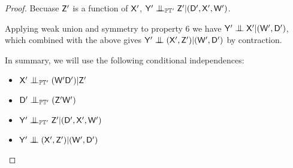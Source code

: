 \begin{proof}
Becuase $\mathsf{Z}'$ is a function of $\mathsf{X}'$, $\RV{Y}'\CI_{\prob{P}\kernel{T}'}\RV{Z}'|(\RV{D}',\RV{X}',\RV{W}')$. 

Applying weak union and symmetry to property 6 we have $\RV{Y}'\CI \RV{X}'|(\RV{W}',\RV{D}')$, which combined with the above gives $\RV{Y}'\CI (\RV{X}', \RV{Z}') |(\RV{W}',\RV{D}')$ by contraction.

In summary, we will use the following conditional independences:
\begin{itemize}
    \item $\RV{X}'\CI_{\prob{P}\kernel{T}'} (\RV{W}' \RV{D}')|\RV{Z}'$
    \item $\RV{D}'\CI_{\prob{P}\kernel{T}'}(\RV{Z}' \RV{W}')$
    \item $\RV{Y}'\CI_{\prob{P}\kernel{T}'}\RV{Z}'|(\RV{D}',\RV{X}',\RV{W}')$
    \item $\RV{Y}'\CI (\RV{X}', \RV{Z}')|(\RV{W}', \RV{D}')$
\end{itemize}


\end{proof}
